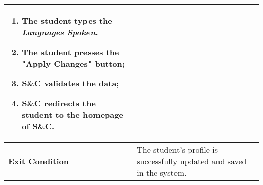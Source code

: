 \begin{enumerate}[label=\textbf{[US\arabic*]}, left = 0pt, align = left]
\begin{longtable}{|l|p{11cm}|}
\begin{enumerate}[label=\arabic*., itemsep=0.2em]
                        \item The student types the \textit{Languages Spoken}.
                        \item The student presses the "Apply Changes" button;
                        \item S\&C validates the data;
                        \item S\&C redirects the student to the homepage of S\&C.
                    \end{enumerate} \\
                \hline
                
                \textbf{Exit Condition} & 
                    The student's profile is successfully updated and saved in the system. \\
                \hline
                

\end{longtable}
\end{enumerate}
